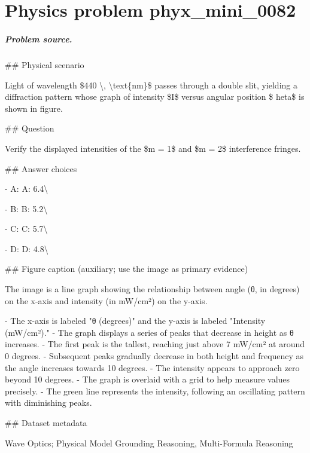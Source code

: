 
\chapter{Physics problem phyx\_mini\_0082}
\label{ch:PhyXMiniProblems_problem_phyx_mini_0082}

\paragraph{Problem source.}
\#\# Physical scenario

Light of wavelength \$440 \textbackslash{}, \textbackslash{}text\{nm\}\$ passes through a double slit, yielding a diffraction pattern whose graph of intensity \$I\$ versus angular position \$	heta\$ is shown in figure.

\#\# Question

Verify the displayed intensities of the \$m = 1\$ and \$m = 2\$ interference fringes.

\#\# Answer choices

- A: A: 6.4\textbackslash{}

- B: B: 5.2\textbackslash{}

- C: C: 5.7\textbackslash{}

- D: D: 4.8\textbackslash{}

\#\# Figure caption (auxiliary; use the image as primary evidence)

The image is a line graph showing the relationship between angle (θ, in degrees) on the x-axis and intensity (in mW/cm²) on the y-axis.

- The x-axis is labeled "θ (degrees)" and the y-axis is labeled "Intensity (mW/cm²)."
- The graph displays a series of peaks that decrease in height as θ increases.
- The first peak is the tallest, reaching just above 7 mW/cm² at around 0 degrees.
- Subsequent peaks gradually decrease in both height and frequency as the angle increases towards 10 degrees.
- The intensity appears to approach zero beyond 10 degrees.
- The graph is overlaid with a grid to help measure values precisely. 
- The green line represents the intensity, following an oscillating pattern with diminishing peaks.

\#\# Dataset metadata

Wave Optics; Physical Model Grounding Reasoning, Multi-Formula Reasoning

